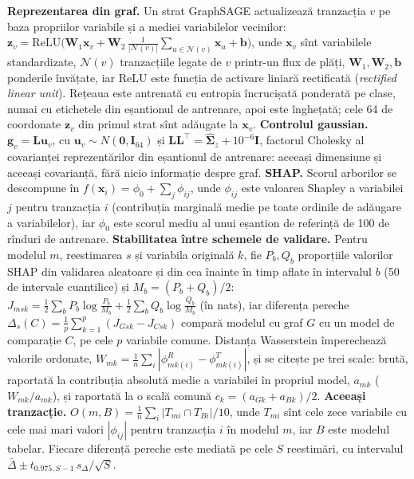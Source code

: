 {\textbf{Reprezentarea din graf.} Un strat GraphSAGE actualizează tranzacția $v$ pe baza propriilor variabile și a mediei variabilelor vecinilor: $\mathbf z_v=\mathrm{ReLU}\big(\mathbf W_1\mathbf x_v+\mathbf W_2\,\tfrac{1}{|\mathcal N(v)|}\sum_{u\in\mathcal N(v)}\mathbf x_u+\mathbf b\big)$, unde $\mathbf x_v$ sînt variabilele standardizate, $\mathcal N(v)$ tranzacțiile legate de $v$ printr-un flux de plăți, $\mathbf W_1,\mathbf W_2,\mathbf b$ ponderile învățate, iar ReLU este funcția de activare liniară rectificată (\emph{rectified linear unit}).
Rețeaua este antrenată cu entropia încrucișată ponderată pe clase, numai cu etichetele din eșantionul de antrenare, apoi este înghețată; cele 64 de coordonate $\mathbf z_v$ din primul strat sînt adăugate la $\mathbf x_v$.
\textbf{Controlul gaussian.} $\mathbf g_v=\mathbf L\mathbf u_v$, cu $\mathbf u_v\sim N(\mathbf 0,\mathbf I_{64})$ și $\mathbf L\mathbf L^\top=\hat{\boldsymbol\Sigma}_z+10^{-6}\mathbf I$, factorul Cholesky al covarianței reprezentărilor din eșantionul de antrenare: aceeași dimensiune și aceeași covarianță, fără nicio informație despre graf.
\textbf{SHAP.} Scorul arborilor se descompune în $f(\mathbf x_i)=\phi_0+\sum_j\phi_{ij}$, unde $\phi_{ij}$ este valoarea Shapley a variabilei $j$ pentru tranzacția $i$ (contribuția marginală medie pe toate ordinile de adăugare a variabilelor), iar $\phi_0$ este scorul mediu al unui eșantion de referință de 100 de rînduri de antrenare.
\textbf{Stabilitatea între schemele de validare.} Pentru modelul $m$, reestimarea $s$ și variabila originală $k$, fie $P_b,Q_b$ proporțiile valorilor SHAP din validarea aleatoare și din cea înainte în timp aflate în intervalul $b$ (50 de intervale cuantilice) și $M_b=(P_b+Q_b)/2$:
$J_{msk}=\tfrac12\sum_b P_b\log\frac{P_b}{M_b}+\tfrac12\sum_b Q_b\log\frac{Q_b}{M_b}$ (în nats), iar diferența pereche $\Delta_s(C)=\tfrac1p\sum_{k=1}^{p}(J_{Gsk}-J_{Csk})$ compară modelul cu graf $G$ cu un model de comparație $C$, pe cele $p$ variabile comune.
Distanța Wasserstein împerechează valorile ordonate, $W_{mk}=\tfrac1n\sum_{i}|\phi^{R}_{mk(i)}-\phi^{T}_{mk(i)}|$, și se citește pe trei scale: brută, raportată la contribuția absolută medie a variabilei în propriul model, $a_{mk}$ ($W_{mk}/a_{mk}$), și raportată la o scală comună $c_k=(a_{Gk}+a_{Bk})/2$.
\textbf{Aceeași tranzacție.} $O(m,B)=\tfrac1n\sum_i|T_{mi}\cap T_{Bi}|/10$, unde $T_{mi}$ sînt cele zece variabile cu cele mai mari valori $|\phi_{ij}|$ pentru tranzacția $i$ în modelul $m$, iar $B$ este modelul tabelar.
Fiecare diferență pereche este mediată pe cele $S$ reestimări, cu intervalul $\bar\Delta\pm t_{0.975,S-1}\,s_\Delta/\sqrt S$.}
